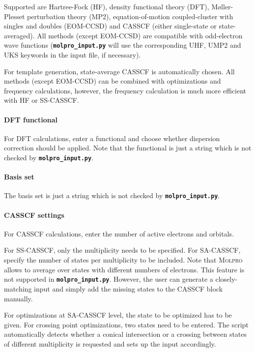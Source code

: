 \documentclass[a4paper,10pt,DIV=15,openany]{scrbook}
\newcommand{\ttt}[1]{\textbf{\texttt{#1}}}
\begin{document}
Supported are Hartree-Fock (HF), density functional theory (DFT), M{\o}ller-Plesset perturbation theory (MP2), equation-of-motion coupled-cluster with singles and doubles (EOM-CCSD) and CASSCF (either single-state or state-averaged). All methods (except EOM-CCSD) are compatible with odd-electron wave functions (\ttt{molpro\_input.py} will use the corresponding UHF, UMP2 and UKS keywords in the input file, if necessary).

For template generation, state-average CASSCF is automatically chosen. All methods (except EOM-CCSD) can be combined with optimizations and frequency calculations, however, the frequency calculation is much more efficient with HF or SS-CASSCF. 

\paragraph{DFT functional}

For DFT calculations, enter a functional and choose whether dispersion correction should be applied. Note that the functional is just a string which is not checked by \ttt{molpro\_input.py}. 

\paragraph{Basis set}

The basis set is just a string which is not checked by \ttt{molpro\_input.py}. 

\paragraph{CASSCF settings}

For CASSCF calculations, enter the number of active electrons and orbitals. 

For SS-CASSCF, only the multiplicity needs to be specified. For SA-CASSCF, specify the number of states per multiplicity to be included. Note that \textsc{Molpro} allows to average over states with different numbers of electrons. This feature is not supported in \ttt{molpro\_input.py}. However, the user can generate a closely-matching input and simply add the missing states to the CASSCF block manually. 

For optimizations at SA-CASSCF level, the state to be optimized has to be given. For crossing point optimizations, two states need to be entered. The script automatically detects whether a conical intersection or a crossing between states of different multiplicity is requested and sets up the input accordingly.
\end{document}
